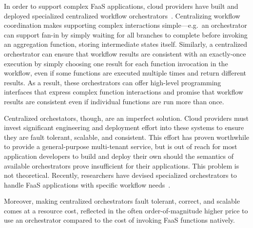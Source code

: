 In order to support complex FaaS applications, cloud providers have built and
deployed specialized centralized workflow
orchestrators~\cite{aws-step-functions, google-cloud-composer, google-workflows,
durable-functions}. Centralizing workflow coordination makes supporting complex
interactions simple---e.g.\ an orchestrator can support fan-in by simply waiting
for all branches to complete before invoking an aggregation function, storing
intermediate states itself. Similarly, a centralized orchestrator can ensure
that workflow results are consistent with an exactly-once execution by simply
choosing one result for each function invocation in the workflow, even if some
functions are executed multiple times and return different results. As a result,
these orchestrators can offer high-level programming interfaces that express
complex function interactions and promise that workflow results are consistent
even if individual functions are run more than once.

Centralized orchestators, though, are an imperfect solution. Cloud providers
must invest significant engineering and deployment effort into these systems to
ensure they are fault tolerant, scalable, and consistent. This effort has proven
worthwhile to provide a general-purpose multi-tenant service, but is out of
reach for most application developers to build and deploy their own should the
semantics of available orchestrators prove insufficient for their applications.
This problem is not theoretical. Recently, researchers have devised specialized
orchestrators to handle FaaS applications with specific workflow
needs~\cite{excamera,gg-atc}.

Moreover, making centralized orchestrators fault tolerant, correct, and scalable
comes at a resource cost, reflected in the often order-of-magnitude higher price
to use an orchestrator compared to the cost of invoking FaaS functions natively.

%

